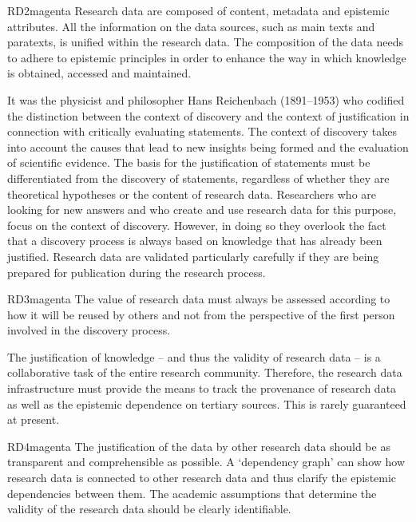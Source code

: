 \documentclass[
  english,
  paper=a4,
  oneside,captions=tableheading
]{scrbook}
\begin{document}
\begin{awesomeblock}[magenta]{1pt}{RD2}{magenta} Research data are composed of content, metadata and epistemic attributes. All the information on the data sources, such as main texts and paratexts, is unified within the research data. The composition of the data needs to adhere to epistemic principles in order to enhance the way in which knowledge is obtained, accessed and maintained.\end{awesomeblock}

It was the physicist and philosopher Hans Reichenbach (1891--1953) who
codified the distinction between the context of discovery and the
context of justification in connection with critically evaluating
statements. The context of discovery takes into account the causes that
lead to new insights being formed and the evaluation of scientific
evidence. The basis for the justification of statements must be
differentiated from the discovery of statements, regardless of whether
they are theoretical hypotheses or the content of research data.
Researchers who are looking for new answers and who create and use
research data for this purpose, focus on the context of discovery.
However, in doing so they overlook the fact that a discovery process is
always based on knowledge that has already been justified. Research data
are validated particularly carefully if they are being prepared for
publication during the research process.

\begin{awesomeblock}[magenta]{1pt}{RD3}{magenta} The value of research data must always be assessed according to how it will be reused by others and not from the perspective of the first person involved in the discovery process.\end{awesomeblock}

The justification of knowledge -- and thus the validity of research data
-- is a collaborative task of the entire research community. Therefore,
the research data infrastructure must provide the means to track the
provenance of research data as well as the epistemic dependence on
tertiary sources. This is rarely guaranteed at present.

\begin{awesomeblock}[magenta]{1pt}{RD4}{magenta} The justification of the data by other research data should be as transparent and comprehensible as possible. A ‘dependency graph’ can show how research data is connected to other research data and thus clarify the epistemic dependencies between them. The academic assumptions that determine the validity of the research data should be clearly identifiable.\end{awesomeblock}
\end{document}
